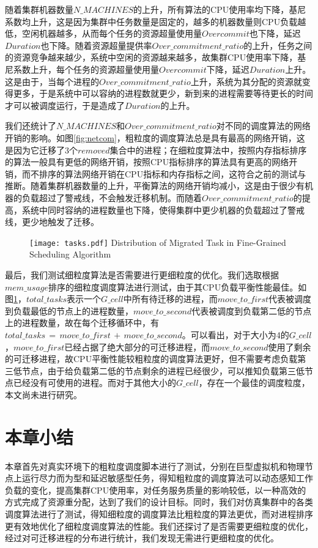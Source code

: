 随着集群机器数量$N\_MACHINES$的上升，所有算法的CPU使用率均下降，基尼系数均上升，这是因为集群中任务数量是固定的，越多的机器数量则CPU负载越低，空闲机器越多，从而每个任务的资源超量使用量$Overcommit$也下降，延迟$Duration$也下降。随着资源超量提供率$Over\_commitment\_ratio$的上升，任务之间的资源竞争越来越少，系统中空闲的资源越来越多，故集群CPU使用率下降，基尼系数上升，每个任务的资源超量使用量$Overcommit$下降，延迟$Duration$上升。这是由于，当每个进程的$Over\_commitment\_ratio$上升，系统为其分配的资源就变得更多，于是系统中可以容纳的进程数就更少，新到来的进程需要等待更长的时间才可以被调度运行，于是造成了$Duration$的上升。

我们还统计了$N\_MACHINES$和$Over\_commitment\_ratio$对不同的调度算法的网络开销的影响。如图\ref{fig:netcom}，粗粒度的调度算法总是具有最高的网络开销，这是因为它迁移了3个$removed$集合中的进程；在细粒度算法中，按照内存指标排序的算法一般具有更低的网络开销，按照CPU指标排序的算法具有更高的网络开销，而不排序的算法网络开销在CPU指标和内存指标之间，这符合之前的测试与推断。随着集群机器数量的上升，平衡算法的网络开销均减小，这是由于很少有机器的负载超过了警戒线，不会触发迁移机制。而随着$Over\_commitment\_ratio$的提高，系统中同时容纳的进程数量也下降，使得集群中更少机器的负载超过了警戒线，更少地触发了迁移。

\begin{figure}[!htp]
  \centering
  \texttt{[image: tasks.pdf]}
    {Distribution of Migrated Task in Fine-Grained Scheduling Algorithm}
  \label{fig:distr}
\end{figure}



最后，我们测试细粒度算法是否需要进行更细粒度的优化。我们选取根据$mem\_usage$排序的细粒度调度算法进行测试，由于其CPU负载平衡性能最佳。如图\ref{fig:distr}，$total\_tasks$表示一个$G\_cell$中所有待迁移的进程，而$move\_to\_first$代表被调度到负载最低的节点上的进程数量，$move\_to\_second$代表被调度到负载第二低的节点上的进程数量，故在每个迁移循环中，有$total\_tasks\,=\,move\_to\_first\,+\,move\_to\_second$。可以看出，对于大小为4的$G\_cell$，$move\_to\_first$已经占据了绝大部分的可迁移进程，而$move\_to\_second$使用了剩余的可迁移进程，故CPU平衡性能较粗粒度的调度算法更好，但不需要考虑负载第三低节点，由于给负载第二低的节点剩余的进程已经很少，可以推知负载第三低节点已经没有可使用的进程。而对于其他大小的$G\_cell$，存在一个最佳的调度粒度，本文尚未进行研究。

\section{本章小结}
本章首先对真实环境下的粗粒度调度脚本进行了测试，分别在巨型虚拟机和物理节点上运行尽力而为型和延迟敏感型任务，得知粗粒度的调度算法可以动态感知工作负载的变化，提高集群CPU使用率，对任务服务质量的影响较低，以一种高效的方式完成了资源重分配，达到了我们的设计目标。同时，我们对仿真集群中的各类调度算法进行了测试，得知细粒度的调度算法比粗粒度的算法更优，而对进程排序更有效地优化了细粒度调度算法的性能。我们还探讨了是否需要更细粒度的优化，经过对可迁移进程的分布进行统计，我们发现无需进行更细粒度的优化。
